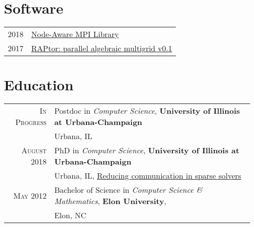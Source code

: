 \documentclass[a4paper,10pt]{article} %
\begin{document}

\section{Software}

\begin{longtable}{rl}	

    2018 & \href{https://github.com/bienz2/Node_Aware_MPI}{Node-Aware MPI Library}\\
    
    2017 & \href{https://github.com/lukeolson/raptor}{RAPtor: parallel algebraic multigrid v0.1}\\
\end{longtable}



\section{Education}

\begin{longtable}{rl}	
    \textsc{In Progress} &Postdoc  in \emph{Computer Science}, \textbf{University of Illinois at Urbana-Champaign}\\
    & Urbana, IL\\

    \textsc{August} 2018 &PhD  in \emph{Computer Science}, \textbf{University of Illinois at Urbana-Champaign}\\
    & Urbana, IL, \href{https://www.ideals.illinois.edu/handle/2142/101514}{Reducing
    communication in sparse solvers}\\


    \textsc{May} 2012 & Bachelor of Science in \emph{Computer Science \&
    Mathematics}, \normalsize\textbf{Elon University},\\
    &Elon, NC\\


\end{longtable}
\end{document}
